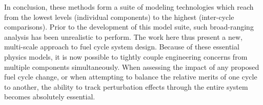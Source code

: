 In conclusion, these methods form a suite of modeling technologies which reach from the lowest levels
(individual components) to the highest (inter-cycle comparisons).
Prior to the development of this model suite, such broad-ranging analysis has been unrealistic to perform.
The work here thus present a new, multi-scale approach to fuel cycle system design.  
Because of these essential physics models, it is now possible to tightly couple engineering 
concerns from multiple components simultaneously.  When assessing the impact of any 
proposed fuel cycle change, or when attempting to balance the relative merits of one 
cycle to another, the ability to track perturbation effects through the entire system becomes
absolutely essential.
